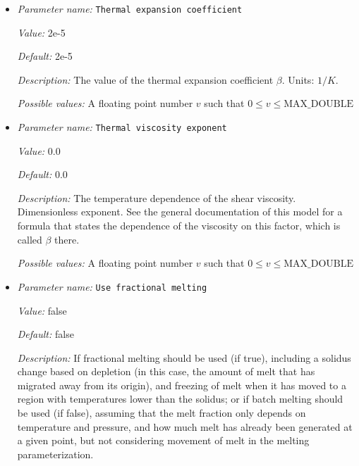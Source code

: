 \begin{itemize}
{\it Possible values:} A floating point number $v$ such that $0 \leq v \leq \text{MAX\_DOUBLE}$
\item {\it Parameter name:} {\tt Thermal expansion coefficient}
\label{parameters:Material model/Melt simple/Thermal expansion coefficient}


{\it Value:} 2e-5


{\it Default:} 2e-5


{\it Description:} The value of the thermal expansion coefficient $\beta$. Units: $1/K$.


{\it Possible values:} A floating point number $v$ such that $0 \leq v \leq \text{MAX\_DOUBLE}$
\item {\it Parameter name:} {\tt Thermal viscosity exponent}
\label{parameters:Material model/Melt simple/Thermal viscosity exponent}


{\it Value:} 0.0


{\it Default:} 0.0


{\it Description:} The temperature dependence of the shear viscosity. Dimensionless exponent. See the general documentation of this model for a formula that states the dependence of the viscosity on this factor, which is called $\beta$ there.


{\it Possible values:} A floating point number $v$ such that $0 \leq v \leq \text{MAX\_DOUBLE}$
\item {\it Parameter name:} {\tt Use fractional melting}
\label{parameters:Material model/Melt simple/Use fractional melting}


{\it Value:} false


{\it Default:} false


{\it Description:} If fractional melting should be used (if true), including a solidus change based on depletion (in this case, the amount of melt that has migrated away from its origin), and freezing of melt when it has moved to a region with temperatures lower than the solidus; or if batch melting should be used (if false), assuming that the melt fraction only depends on temperature and pressure, and how much melt has already been generated at a given point, but not considering movement of melt in the melting parameterization.


\end{itemize}
